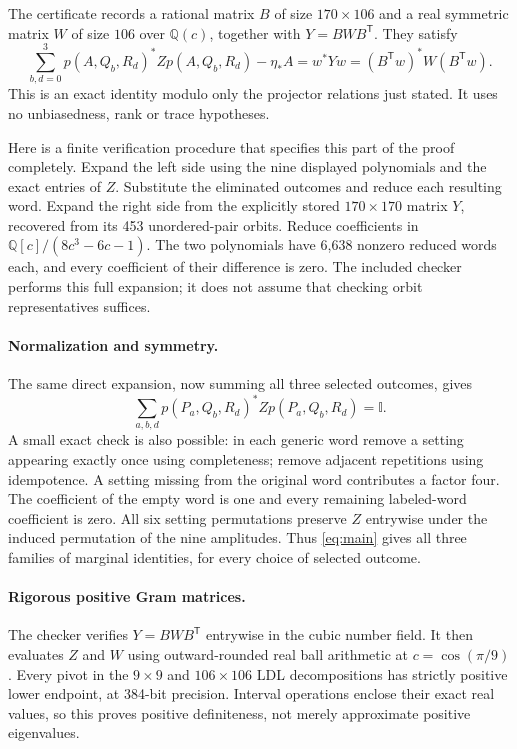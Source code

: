\documentclass[11pt]{article}
\newcommand{\Id}{\mathbb I}
\begin{document}
The certificate records a rational matrix $B$ of size $170\times106$ and a real symmetric matrix $W$ of size $106$ over $\mathbb Q(c)$, together with $Y=BWB^\mathsf T$. They satisfy
\begin{equation}\label{eq:main}
 \sum_{b,d=0}^3p(A,Q_b,R_d)^*Zp(A,Q_b,R_d)
           -\eta_*A=w^*Yw=(B^\mathsf Tw)^*W(B^\mathsf Tw).
\end{equation}
This is an exact identity modulo only the projector relations just stated. It uses no unbiasedness, rank or trace hypotheses.

Here is a finite verification procedure that specifies this part of the proof completely. Expand the left side using the nine displayed polynomials and the exact entries of $Z$. Substitute the eliminated outcomes and reduce each resulting word. Expand the right side from the explicitly stored $170\times170$ matrix $Y$, recovered from its 453 unordered-pair orbits. Reduce coefficients in $\mathbb Q[c]/(8c^3-6c-1)$. The two polynomials have 6,638 nonzero reduced words each, and every coefficient of their difference is zero. The included checker performs this full expansion; it does not assume that checking orbit representatives suffices.

\paragraph{Normalization and symmetry.}
The same direct expansion, now summing all three selected outcomes, gives
\begin{equation}\label{eq:norm}
 \sum_{a,b,d}p(P_a,Q_b,R_d)^*Zp(P_a,Q_b,R_d)=\Id.
\end{equation}
A small exact check is also possible: in each generic word remove a setting appearing exactly once using completeness; remove adjacent repetitions using idempotence. A setting missing from the original word contributes a factor four. The coefficient of the empty word is one and every remaining labeled-word coefficient is zero. All six setting permutations preserve $Z$ entrywise under the induced permutation of the nine amplitudes. Thus \eqref{eq:main} gives all three families of marginal identities, for every choice of selected outcome.

\paragraph{Rigorous positive Gram matrices.}
The checker verifies $Y=BWB^\mathsf T$ entrywise in the cubic number field. It then evaluates $Z$ and $W$ using outward-rounded real ball arithmetic at $c=\cos(\pi/9)$. Every pivot in the $9\times9$ and $106\times106$ LDL decompositions has strictly positive lower endpoint, at 384-bit precision. Interval operations enclose their exact real values, so this proves positive definiteness, not merely approximate positive eigenvalues.
\end{document}

